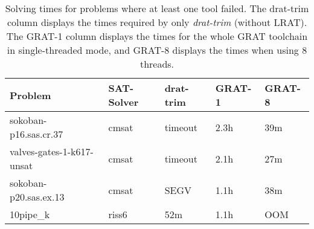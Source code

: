 \documentclass[smallcondensed]{svjour3}     %
\begin{document}
  \begin{table}[!t]
  \begin{center}    
  \begin{tabular}{|l|l|l|l|l|}
    \bf Problem               & \bf SAT-Solver & \bf drat-trim & \bf GRAT-1 & \bf GRAT-8 \\\hline
    sokoban-p16.sas.cr.37     & cmsat          &     timeout   & 2.3h       &     39m    \\
    valves-gates-1-k617-unsat & cmsat          &     timeout   & 2.1h       &     27m    \\
    sokoban-p20.sas.ex.13     & cmsat          &     SEGV      & 1.1h       &     38m    \\
    10pipe\_k                 & riss6          &     52m       & 1.1h       &     OOM    \\ \hline
  \end{tabular}
  \caption{Solving times for problems where at least one tool failed. 
    The drat-trim column displays the times required by only {\sl drat-trim} (without LRAT).
    The {GRAT-1} column displays the times for the whole GRAT toolchain in single-threaded mode, 
    and {GRAT-8} displays the times when using 8 threads.}\label{tab:failed_times}
  \end{center}    
  \end{table}
  
    
  
\end{document}
